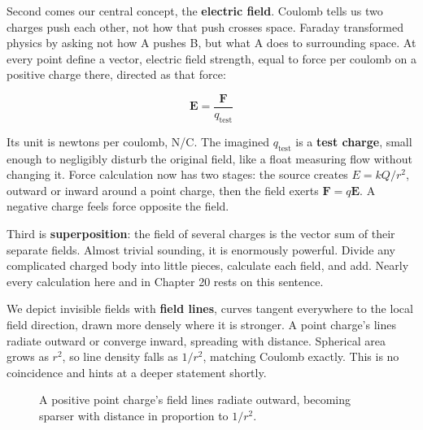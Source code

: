 \begin{mainline}
Second comes our central concept, the \textbf{electric field}. Coulomb tells us two charges push each other, not how that push crosses space. Faraday transformed physics by asking not how A pushes B, but what A does to surrounding space. At every point define a vector, electric field strength, equal to force per coulomb on a positive charge there, directed as that force:

\[ \mathbf E = \frac{\mathbf F}{q_{\text{test}}} \]

Its unit is newtons per coulomb, N/C. The imagined \(q_{\text{test}}\) is a \textbf{test charge}, small enough to negligibly disturb the original field, like a float measuring flow without changing it. Force calculation now has two stages: the source creates \(E = kQ/r^2\), outward or inward around a point charge, then the field exerts \(\mathbf F = q\mathbf E\). A negative charge feels force opposite the field.

Third is \textbf{superposition}: the field of several charges is the vector sum of their separate fields. Almost trivial sounding, it is enormously powerful. Divide any complicated charged body into little pieces, calculate each field, and add. Nearly every calculation here and in Chapter 20 rests on this sentence.

We depict invisible fields with \textbf{field lines}, curves tangent everywhere to the local field direction, drawn more densely where it is stronger. A point charge's lines radiate outward or converge inward, spreading with distance. Spherical area grows as \(r^2\), so line density falls as \(1/r^2\), matching Coulomb exactly. This is no coincidence and hints at a deeper statement shortly.
\end{mainline}

\begin{figure}[htbp]
\centering
{}
\caption{A positive point charge's field lines radiate outward, becoming sparser with distance in proportion to \(1/r^2\).}
\end{figure}

